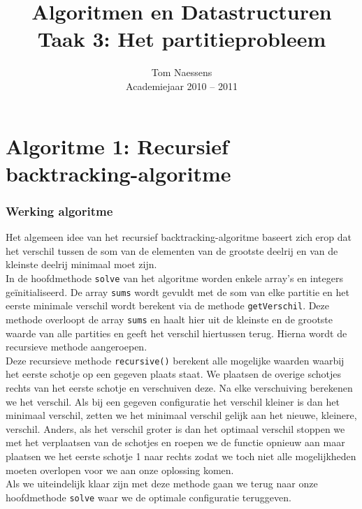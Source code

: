 \documentclass[12pt,a4paper]{report}
\title{Algoritmen en Datastructuren\\ Taak 3: Het partitieprobleem}
\author{Tom Naessens\\ Academiejaar 2010 -- 2011}
\begin{document}
\maketitle

\section*{Algoritme 1: Recursief backtracking-algoritme}
\subsubsection*{Werking algoritme}
Het algemeen idee van het recursief backtracking-algoritme baseert zich erop dat het verschil tussen de som van de elementen van de grootste deelrij en van de kleinste deelrij minimaal moet zijn.
\\
In de hoofdmethode \texttt{solve} van het algoritme worden enkele array's en integers ge\"initialiseerd. De array \texttt{sums} wordt gevuldt met de som van elke partitie en het eerste minimale verschil wordt berekent via de methode \texttt{getVerschil}. Deze methode overloopt de array \texttt{sums} en haalt hier uit de kleinste en de grootste waarde van alle partities en geeft het verschil hiertussen terug. Hierna wordt de recursieve methode aangeroepen.\\
Deze recursieve methode \texttt{recursive()} berekent alle mogelijke waarden waarbij het eerste schotje op een gegeven plaats staat. We plaatsen de overige schotjes rechts van het eerste schotje en verschuiven deze. Na elke verschuiving berekenen we het verschil. Als bij een gegeven configuratie het verschil kleiner is dan het minimaal verschil, zetten we het minimaal verschil gelijk aan het nieuwe, kleinere, verschil. Anders, als het verschil groter is dan het optimaal verschil stoppen we met het verplaatsen van de schotjes en roepen we de functie opnieuw aan maar plaatsen we het eerste schotje 1 naar rechts zodat we toch niet alle mogelijkheden moeten overlopen voor we aan onze oplossing komen.\\
Als we uiteindelijk klaar zijn met deze methode gaan we terug naar onze hoofdmethode \texttt{solve} waar we de optimale configuratie teruggeven.
\end{document}
